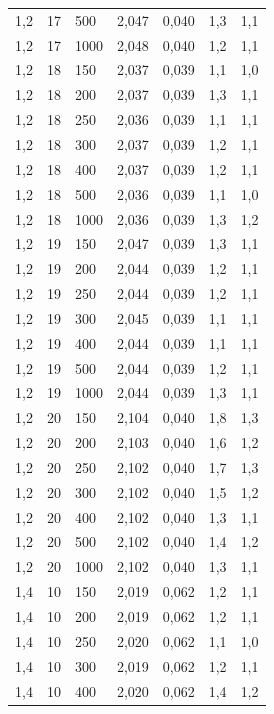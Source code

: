 \begin{tabular}{lllllll}
        1,2 & 17 & 500 & 2,047 & 0,040 & 1,3 & 1,1 \\ 
        1,2 & 17 & 1000 & 2,048 & 0,040 & 1,2 & 1,1 \\ 
        1,2 & 18 & 150 & 2,037 & 0,039 & 1,1 & 1,0 \\ 
        1,2 & 18 & 200 & 2,037 & 0,039 & 1,3 & 1,1 \\ 
        1,2 & 18 & 250 & 2,036 & 0,039 & 1,1 & 1,1 \\ 
        1,2 & 18 & 300 & 2,037 & 0,039 & 1,2 & 1,1 \\ 
        1,2 & 18 & 400 & 2,037 & 0,039 & 1,2 & 1,1 \\ 
        1,2 & 18 & 500 & 2,036 & 0,039 & 1,1 & 1,0 \\ 
        1,2 & 18 & 1000 & 2,036 & 0,039 & 1,3 & 1,2 \\ 
        1,2 & 19 & 150 & 2,047 & 0,039 & 1,3 & 1,1 \\ 
        1,2 & 19 & 200 & 2,044 & 0,039 & 1,2 & 1,1 \\ 
        1,2 & 19 & 250 & 2,044 & 0,039 & 1,2 & 1,1 \\ 
        1,2 & 19 & 300 & 2,045 & 0,039 & 1,1 & 1,1 \\ 
        1,2 & 19 & 400 & 2,044 & 0,039 & 1,1 & 1,1 \\ 
        1,2 & 19 & 500 & 2,044 & 0,039 & 1,2 & 1,1 \\ 
        1,2 & 19 & 1000 & 2,044 & 0,039 & 1,3 & 1,1 \\ 
        1,2 & 20 & 150 & 2,104 & 0,040 & 1,8 & 1,3 \\ 
        1,2 & 20 & 200 & 2,103 & 0,040 & 1,6 & 1,2 \\ 
        1,2 & 20 & 250 & 2,102 & 0,040 & 1,7 & 1,3 \\ 
        1,2 & 20 & 300 & 2,102 & 0,040 & 1,5 & 1,2 \\ 
        1,2 & 20 & 400 & 2,102 & 0,040 & 1,3 & 1,1 \\ 
        1,2 & 20 & 500 & 2,102 & 0,040 & 1,4 & 1,2 \\ 
        1,2 & 20 & 1000 & 2,102 & 0,040 & 1,3 & 1,1 \\ 
        1,4 & 10 & 150 & 2,019 & 0,062 & 1,2 & 1,1 \\ 
        1,4 & 10 & 200 & 2,019 & 0,062 & 1,2 & 1,1 \\ 
        1,4 & 10 & 250 & 2,020 & 0,062 & 1,1 & 1,0 \\ 
        1,4 & 10 & 300 & 2,019 & 0,062 & 1,2 & 1,1 \\ 
        1,4 & 10 & 400 & 2,020 & 0,062 & 1,4 & 1,2 \\ 

\end{tabular}

